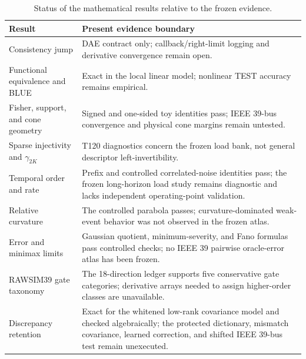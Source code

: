 \begin{table}[t]
\caption{Status of the mathematical results relative to the frozen evidence.}
\label{tab:supp-theory-status}
\centering
\scriptsize
\begin{tabularx}{\columnwidth}{@{}p{}X@{}}
\toprule
Result & Present evidence boundary \\
\midrule
Consistency jump & DAE contract only; callback/right-limit logging and derivative convergence remain open. \\
Functional equivalence and BLUE & Exact in the local linear model; nonlinear TEST accuracy remains empirical. \\
Fisher, support, and cone geometry & Signed and one-sided toy identities pass; IEEE 39-bus convergence and physical cone margins remain untested. \\
Sparse injectivity and $\gamma_{2K}$ & T120 diagnostics concern the frozen load bank, not general descriptor left-invertibility. \\
Temporal order and rate & Prefix and controlled correlated-noise identities pass; the frozen long-horizon load study remains diagnostic and lacks independent operating-point validation. \\
Relative curvature & The controlled parabola passes; curvature-dominated weak-event behavior was not observed in the frozen atlas. \\
Error and minimax limits & Gaussian quotient, minimum-severity, and Fano formulas pass controlled checks; no IEEE 39 pairwise oracle-error atlas has been frozen. \\
RAWSIM39 gate taxonomy & The 18-direction ledger supports five conservative gate categories; derivative arrays needed to assign higher-order classes are unavailable. \\
Discrepancy retention & Exact for the whitened low-rank covariance model and checked algebraically; the protected dictionary, mismatch covariance, learned correction, and shifted IEEE 39-bus test remain unexecuted. \\
\bottomrule
\end{tabularx}
\end{table}
